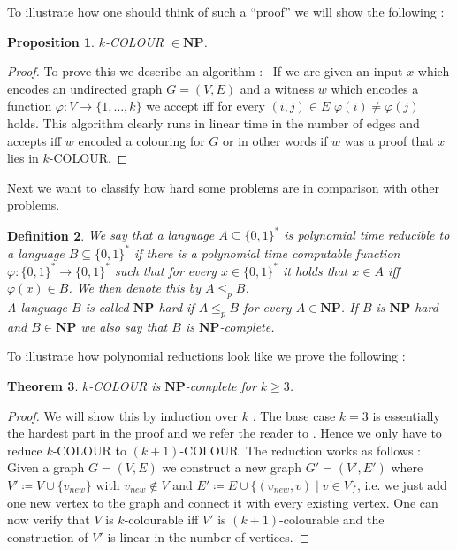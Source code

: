 \documentclass[12pt,a4paper]{scrartcl}
\newtheorem{Theorem}{Theorem}[section]
\newtheorem{Proposition}[Theorem]{Proposition}
\newtheorem{Definition}[Theorem]{Definition}
\numberwithin{equation}{section}
\newcommand{\NPcomplexity}{\mathbf{NP}}
\begin{document}
To illustrate how one should think of such a ``proof''  we will show the following :

\begin{Proposition}
 $k$-COLOUR $\in \NPcomplexity$.
\end{Proposition}

\begin{proof}
 To prove this we describe an algorithm : \
 If we are given an input $x$ which encodes an undirected graph $G = (V,E)$ and a witness $w$ which encodes a 
 function $\varphi \colon V \to \lbrace 1, \dotsc, k \rbrace$ we accept iff for every $(i,j) \in E$  $\varphi(i) \neq \varphi(j)$ holds.
 This algorithm clearly runs in linear time in the number of edges and accepts iff $w$ encoded a  colouring for $G$ or in other words if
 $w$ was a proof that $x$ lies in $k$-COLOUR.
\end{proof}

Next we want to classify how hard some problems are in comparison with other problems.

\begin{Definition}
 We say that a language $A \subseteq {\lbrace 0,1 \rbrace}^*$ is \emph{polynomial time reducible} to a language 
 $B \subseteq {\lbrace 0,1 \rbrace}^*$ if there is a polynomial time computable function 
 ${\varphi \colon {\lbrace 0,1 \rbrace}^* \to {\lbrace 0,1 \rbrace}^*}$ such that for every $x \in {\lbrace 0,1 \rbrace}^*$ 
 it holds that $x \in A$ iff $\varphi (x) \in B$. We then denote this by $ A \leq_p B$. \\
 A language $B$ is called \emph{$\NPcomplexity$-hard} if $A \leq_p B$ for every $A \in \NPcomplexity$. If $B$ is $\NPcomplexity$-hard
 and $B \in \NPcomplexity$ we also say that $B$ is \emph{$\NPcomplexity$-complete}.
\end{Definition}

To illustrate how polynomial reductions look like we prove the following :

\begin{Theorem}
  $k$-COLOUR is $\NPcomplexity$-complete for $k \geq 3$.
\end{Theorem}

\begin{proof}
 We will show this by induction over $k$ .
 The base case $k = 3$ is essentially the hardest part in the proof and we refer the reader to \cite{Rothe2005}.
 Hence we only have to reduce $k$-COLOUR to $(k+1)$-COLOUR. The reduction works as follows :
 Given a graph $G = (V,E)$ we construct a new graph $G' = (V', E')$ where $V' \coloneqq V \cup \lbrace v_{new} \rbrace$ with
 $v_{new} \notin V$ and $E' \coloneqq E \cup \lbrace (v_{new}, v) \; | \; v \in V \rbrace$, i.e. we just add one new vertex to the graph
 and connect it with every existing vertex. One can now verify that $V$ is $k$-colourable iff $V'$ is $(k+1)$-colourable and the
 construction of $V'$ is linear in the number of vertices.
 
\end{proof}
\end{document}
